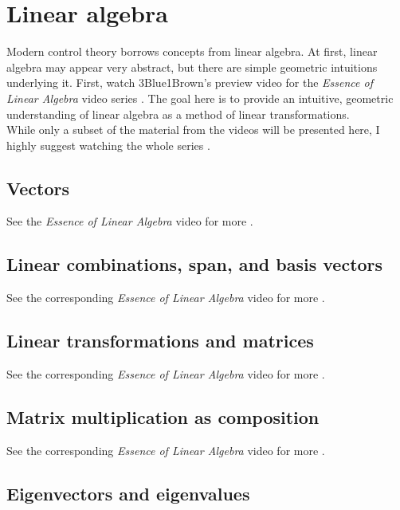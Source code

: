 \section{Linear algebra}

Modern control theory borrows concepts from linear algebra. At first, linear
algebra may appear very abstract, but there are simple geometric intuitions
underlying it. First, watch 3Blue1Brown's preview video for the
\textit{Essence of Linear Algebra} video series \cite{bib:linalg_preview}. The
goal here is to provide an intuitive, geometric understanding of linear algebra
as a method of linear transformations. \\

While only a subset of the material from the videos will be presented here, I
highly suggest watching the whole series \cite{bib:essence_of_linalg}.

\subsection{Vectors}

See the \textit{Essence of Linear Algebra} video for more
\cite{bib:linalg_vectors}.

\subsection{Linear combinations, span, and basis vectors}

See the corresponding \textit{Essence of Linear Algebra} video for more
\cite{bib:linalg_linear_combinations}.

\subsection{Linear transformations and matrices}

See the corresponding \textit{Essence of Linear Algebra} video for more
\cite{bib:linalg_linear_transformations_and_matrices}.

\subsection{Matrix multiplication as composition}

See the corresponding \textit{Essence of Linear Algebra} video for more
\cite{bib:linalg_matrix_multiplication_as_composition}.

\subsection{Eigenvectors and eigenvalues}

